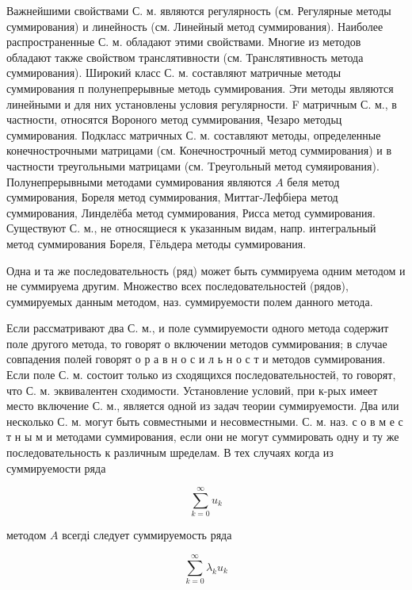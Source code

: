 \documentclass[10pt]{article}
\begin{document}
Важнейшими свойствами С. м. являются регулярность (см. Регулярные методы суммирования) и линейность (см. Линейный метод суммирования). Наиболее распространенные С. м. обладают этими свойствами. Многие из методов обладают также свойством транслятивности (см. Транслятивность метода суммирования). Широкий класс С. м. составляют матричные методы суммирования п полунепрерывные методь суммирования. Эти методы являются линейными и для них установлены условия регулярности. F матричным С. м., в частности, относятся Вороного метод суммирования, Чезаро методьц суммирования. Подкласс матричных С. м. составляют методы, определенные конечнострочными матрицами (см. Конечнострочный метод суммирования) и в частности треугольными матрицами (см. Tреугольный метод сумяирования). Полунепрерывными методами суммирования являются $A$ беля метод суммирования, Бореля метод суммирования, Миттаг-Лефбіера метод суммирования, Линделёба метод суммирования, Рисса метод суммирования. Существуют С. м., не относящиеся к указанным видам, напр. интегральный метод суммирования Бореля, Гёльдера методы суммирования.



Одна и та же последовательность (ряд) может быть суммируема одним методом и не суммируема другим. Множество всех последовательностей (рядов), суммируемых данным методом, наз. суммируемости полем данного метода.



Если рассматривают два С. м., и поле суммируемости одного метода содержит поле другого метода, то говорят о включении методов суммирования; в случае совпадения полей говорят о р а в н о с и л ь н о с т и методов суммирования. Если поле С. м. состоит только из сходящихся последовательностей, то говорят, что С. м. эквивалентен сходимости. Установление условий, при к-рых имеет место включение С. м., является одной из задач теории суммируемости. Два или несколько С. м. могут быть совместными и несовместными. С. м. наз. с о в м е с т н ы м и методами суммирования, если они не могут суммировать одну и ту же последовательность к различным шределам. В тех случаях когда из суммируемости ряда



\[

\sum_{k=0}^{\infty} u_{k}

\]



методом $A$ всегді следует суммируемость ряда



\[

\sum_{k=0}^{\infty} \lambda_{k} u_{k}

\]
\end{document}
